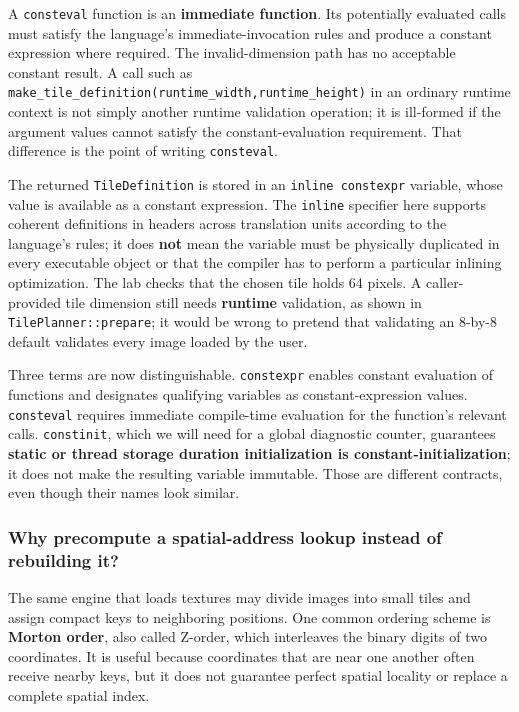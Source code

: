 A \texttt{consteval} function is an \textbf{immediate function}. Its potentially evaluated calls must satisfy the language's immediate-invocation rules and produce a constant expression where required. The invalid-dimension path has no acceptable constant result. A call such as \texttt{make\_tile\_definition(runtime\_width,runtime\_height)} in an ordinary runtime context is not simply another runtime validation operation; it is ill-formed if the argument values cannot satisfy the constant-evaluation requirement. That difference is the point of writing \texttt{consteval}.

The returned \texttt{TileDefinition} is stored in an \texttt{inline\ constexpr} variable, whose value is available as a constant expression. The \texttt{inline} specifier here supports coherent definitions in headers across translation units according to the language's rules; it does \textbf{not} mean the variable must be physically duplicated in every executable object or that the compiler has to perform a particular inlining optimization. The lab checks that the chosen tile holds 64 pixels. A caller-provided tile dimension still needs \textbf{runtime} validation, as shown in \texttt{TilePlanner::prepare}; it would be wrong to pretend that validating an 8-by-8 default validates every image loaded by the user.

Three terms are now distinguishable. \texttt{constexpr} enables constant evaluation of functions and designates qualifying variables as constant-expression values. \texttt{consteval} requires immediate compile-time evaluation for the function's relevant calls. \texttt{constinit}, which we will need for a global diagnostic counter, guarantees \textbf{static or thread storage duration initialization is constant-initialization}; it does not make the resulting variable immutable. Those are different contracts, even though their names look similar.

\subsubsection{Why precompute a spatial-address lookup instead of rebuilding it?}\label{why-precompute-a-spatial-address-lookup-instead-of-rebuilding-it}

The same engine that loads textures may divide images into small tiles and assign compact keys to neighboring positions. One common ordering scheme is \textbf{Morton order}, also called Z-order, which interleaves the binary digits of two coordinates. It is useful because coordinates that are near one another often receive nearby keys, but it does not guarantee perfect spatial locality or replace a complete spatial index.

